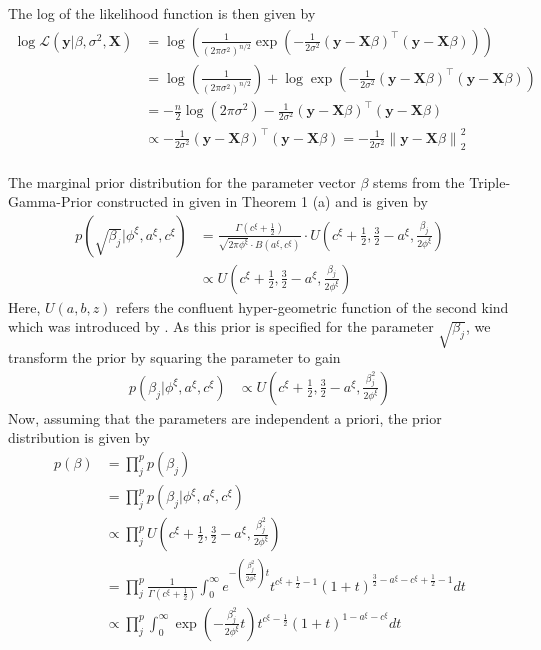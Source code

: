 \documentclass[12pt,a4paper]{article}
\newcommand{\norm}[1]{\left\lVert#1\right\rVert}
\begin{document}
The log of the likelihood function is then given by 
\begin{align*}
\log \mathcal{L}( \mathbf{y} |\beta, \sigma^2 , \mathbf{X}) &= \log \left( \frac{1}{(2\pi\sigma^2)^{n/2}} \exp\left(-\frac{1}{2\sigma^2} (\mathbf{y} - \mathbf{X}\beta)^\top (\mathbf{y} - \mathbf{X}\beta)\right) \right) \\
&= \log \left( \frac{1}{(2\pi\sigma^2)^{n/2}} \right) + \log \exp\left(-\frac{1}{2\sigma^2} (\mathbf{y} - \mathbf{X}\beta)^\top (\mathbf{y} - \mathbf{X}\beta)\right) \\
&= -\frac{n}{2} \log(2\pi\sigma^2) - \frac{1}{2\sigma^2} (\mathbf{y} - \mathbf{X}\beta)^\top (\mathbf{y} - \mathbf{X}\beta)\\
&\propto - \frac{1}{2\sigma^2} (\mathbf{y} - \mathbf{X}\beta)^\top (\mathbf{y} - \mathbf{X}\beta) = - \frac{1}{2\sigma^2}\norm{\mathbf{y} - \mathbf{X}\beta}_2^2\\
\end{align*}

The marginal prior distribution for the parameter vector $\beta$ stems from the Triple-Gamma-Prior constructed in \textcite{TGP2020} given in Theorem 1 (a) and is given by
\begin{align*}
p(\sqrt{\beta_j}|\phi^\xi, a^\xi, c^\xi) &= \frac{\Gamma(c^\xi + \frac{1}{2})}{\sqrt{2\pi \phi^\xi}\cdot B(a^\xi, c^\xi)}\cdot U\left(c^\xi + \frac{1}{2}, \frac{3}{2}-a^\xi, \frac{\beta_j}{2\phi^\xi}\right)\\
&\propto U\left(c^\xi + \frac{1}{2}, \frac{3}{2}-a^\xi, \frac{\beta_j}{2\phi^\xi}\right)
\end{align*}
Here, $U(a,b,z)$ refers the confluent hyper-geometric function of the second kind which was introduced by \textcite{Tricomi1947}. As this prior is specified for the parameter $\sqrt{\beta_j}$, we transform the prior by squaring the parameter to gain
\begin{align*}
p(\beta_j|\phi^\xi, a^\xi, c^\xi) &\propto U\left(c^\xi + \frac{1}{2}, \frac{3}{2}-a^\xi, \frac{\beta_j^2}{2\phi^\xi}\right)
\end{align*}
Now, assuming that the parameters are independent a priori, the prior distribution is given by
\begin{align}
p(\beta) 	&= \prod_j^p p(\beta_j) \nonumber\\
			&= \prod_j^p p(\beta_j|\phi^\xi, a^\xi, c^\xi) \nonumber\\
			&\propto \prod_j^p U\left(c^\xi + \frac{1}{2}, \frac{3}{2}-a^\xi, \frac{\beta_j^2}{2\phi^\xi}\right) \nonumber\\
			&= \prod_j^p \frac{1}{\Gamma(c^\xi + \frac{1}{2})}\int_0^\infty e^{-(\frac{\beta_j^2}{2\phi^\xi})t}t^{c^\xi + \frac{1}{2}-1}(1+t)^{\frac{3}{2}-a^\xi-c^\xi + \frac{1}{2}-1}dt \nonumber\\
			&\propto \prod_j^p \int_0^\infty \exp\left(-\frac{\beta_j^2}{2\phi^\xi}t\right)t^{c^\xi - \frac{1}{2}}(1+t)^{1-a^\xi-c^\xi} dt \label{eq:prior}
\end{align}
\end{document}
